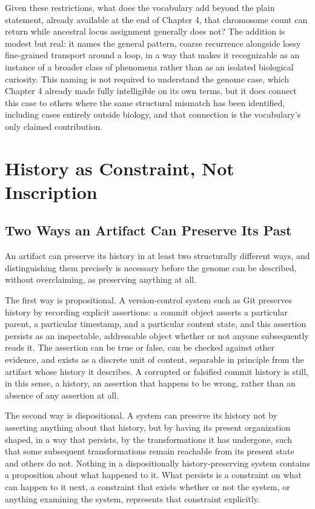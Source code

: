 \documentclass[11pt]{book}
\begin{document}
Given these restrictions, what does the vocabulary add beyond the plain statement, already available at the end of Chapter 4, that chromosome count can return while ancestral locus assignment generally does not? The addition is modest but real: it names the general pattern, coarse recurrence alongside lossy fine-grained transport around a loop, in a way that makes it recognizable as an instance of a broader class of phenomena rather than as an isolated biological curiosity. This naming is not required to understand the genome case, which Chapter 4 already made fully intelligible on its own terms, but it does connect this case to others where the same structural mismatch has been identified, including cases entirely outside biology, and that connection is the vocabulary's only claimed contribution.

\chapter{History as Constraint, Not Inscription}

\section{Two Ways an Artifact Can Preserve Its Past}

An artifact can preserve its history in at least two structurally different ways, and distinguishing them precisely is necessary before the genome can be described, without overclaiming, as preserving anything at all.

The first way is propositional. A version-control system such as Git preserves history by recording explicit assertions: a commit object asserts a particular parent, a particular timestamp, and a particular content state, and this assertion persists as an inspectable, addressable object whether or not anyone subsequently reads it. The assertion can be true or false, can be checked against other evidence, and exists as a discrete unit of content, separable in principle from the artifact whose history it describes. A corrupted or falsified commit history is still, in this sense, a history, an assertion that happens to be wrong, rather than an absence of any assertion at all.

The second way is dispositional. A system can preserve its history not by asserting anything about that history, but by having its present organization shaped, in a way that persists, by the transformations it has undergone, such that some subsequent transformations remain reachable from its present state and others do not. Nothing in a dispositionally history-preserving system contains a proposition about what happened to it. What persists is a constraint on what can happen to it next, a constraint that exists whether or not the system, or anything examining the system, represents that constraint explicitly.
\end{document}
